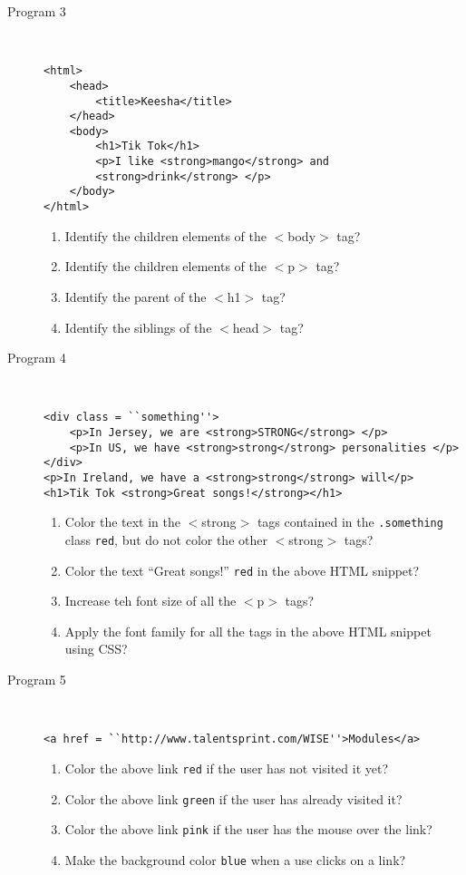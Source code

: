 \documentclass[11pt,a4paper]{article}
\def\AnswerBox{\fbox{\begin{minipage}{4in}\hfill\vspace{0.5in}\end{minipage}}}
\begin{document}
\begin{description}
\item [Program 3]\
\begin{lstlisting}
<html>
    <head>
        <title>Keesha</title>
    </head>
    <body>
        <h1>Tik Tok</h1>
        <p>I like <strong>mango</strong> and 
        <strong>drink</strong> </p>
    </body>
</html>
\end{lstlisting}
\AnswerBox
\begin{enumerate}[label=\bfseries Q\arabic*:]\itemsep10pt
\item Identify the children elements of the $<$body$>$ tag?
\item Identify the children elements of the $<$p$>$ tag?
\item Identify the parent of the $<$h1$>$ tag?
\item Identify the siblings of the $<$head$>$ tag?
\end{enumerate}

\item [Program 4]\
\begin{lstlisting}
<div class = ``something''>
    <p>In Jersey, we are <strong>STRONG</strong> </p>
    <p>In US, we have <strong>strong</strong> personalities </p>
</div>
<p>In Ireland, we have a <strong>strong</strong> will</p>
<h1>Tik Tok <strong>Great songs!</strong></h1>
\end{lstlisting}
\AnswerBox
\begin{enumerate}[label=\bfseries Q\arabic*:]\itemsep10pt
\item Color the text in the $<$strong$>$ tags contained in the \texttt{.something} class \texttt{red}, but do not color the other $<$strong$>$ tags?
\item Color the text ``Great songs!'' \texttt{red} in the above HTML snippet?
\item Increase teh font size of all the $<$p$>$ tags?
\item Apply the font family for all the tags in the above HTML snippet using CSS?
\end{enumerate}

\item [Program 5]\
\begin{lstlisting}
<a href = ``http://www.talentsprint.com/WISE''>Modules</a>
\end{lstlisting}
\AnswerBox
\begin{enumerate}[label=\bfseries Q\arabic*:]\itemsep10pt
\item Color the above link \texttt{red} if the user has not visited it yet?
\item Color the above link \texttt{green} if the user has already visited it?
\item Color the above link \texttt{pink} if the user has the mouse over the link?
\item Make the background color \texttt{blue} when a use clicks on a link?
\end{enumerate}


\end{description}
\end{document}
